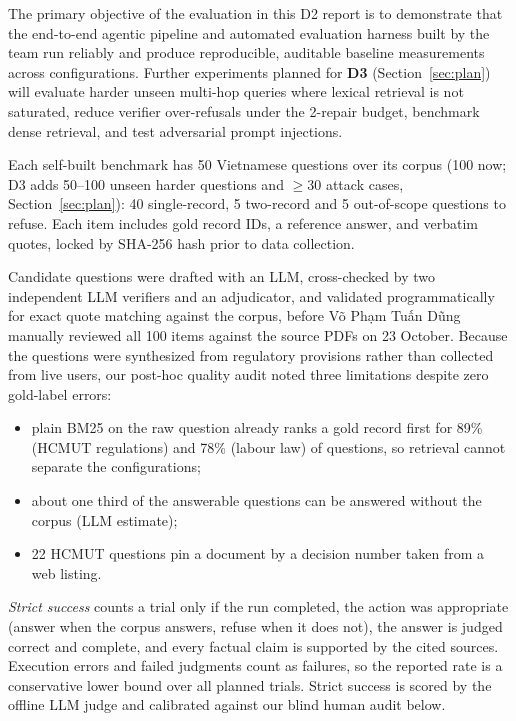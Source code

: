  The primary objective of the evaluation in this D2 report is to demonstrate that the end-to-end agentic pipeline and automated evaluation harness built by the team run reliably and produce reproducible, auditable baseline measurements across configurations. Further experiments planned for \textbf{D3} (Section~\ref{sec:plan}) will evaluate harder unseen multi-hop queries where lexical retrieval is not saturated, reduce verifier over-refusals under the 2-repair budget, benchmark dense retrieval, and test adversarial prompt injections.

 Each self-built benchmark has 50 Vietnamese questions over its corpus (100 now; D3 adds 50--100 unseen harder questions and $\ge$30 attack cases, Section~\ref{sec:plan}): 40 single-record, 5 two-record and 5 out-of-scope questions to refuse. Each item includes gold record IDs, a reference answer, and verbatim quotes, locked by SHA-256 hash prior to data collection.

Candidate questions were drafted with an LLM, cross-checked by two independent LLM verifiers and an adjudicator, and validated programmatically for exact quote matching against the corpus, before Võ Phạm Tuấn Dũng manually reviewed all 100 items against the source PDFs on 23 October. Because the questions were synthesized from regulatory provisions rather than collected from live users, our post-hoc quality audit noted three limitations despite zero gold-label errors:
\begin{itemize}
\item plain BM25 on the raw question already ranks a gold record first for 89\% (HCMUT regulations) and 78\% (labour law) of questions, so retrieval cannot separate the configurations;
\item about one third of the answerable questions can be answered without the corpus (LLM estimate);
\item 22 HCMUT questions pin a document by a decision number taken from a web listing.
\end{itemize}

 \emph{Strict success} counts a trial only if the run completed, the action was appropriate (answer when the corpus answers, refuse when it does not), the answer is judged correct and complete, and every factual claim is supported by the cited sources. Execution errors and failed judgments count as failures, so the reported rate is a conservative lower bound over all planned trials. Strict success is scored by the offline LLM judge and calibrated against our blind human audit below.

